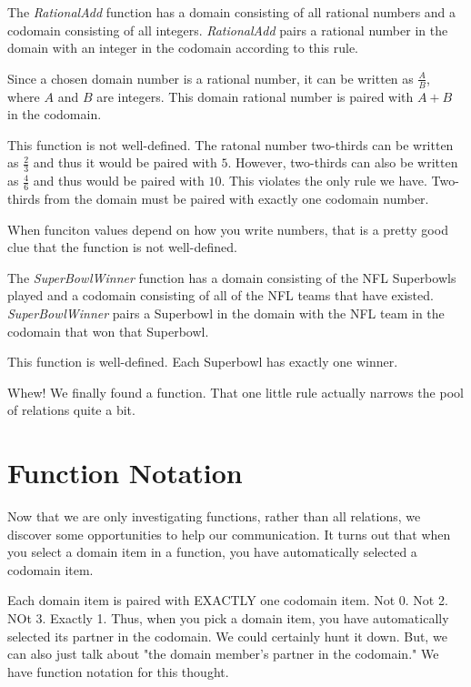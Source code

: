 \documentclass{ximera}
\begin{document}
\begin{example}
The \textit{RationalAdd} function has a domain consisting of all rational numbers and a codomain consisting of all integers.  \textit{RationalAdd} pairs a rational number in the domain with an integer in the codomain according to this rule.

Since a chosen domain number is a rational number, it can be written as $\tfrac{A}{B}$, where $A$ and $B$ are integers. This domain rational number is paired with $A+B$ in the codomain.

This function is not well-defined.  The ratonal number two-thirds can be written as $\tfrac{2}{3}$ and thus it would be paired with $5$.  However, two-thirds can also be written as $\tfrac{4}{6}$ and thus would be paired with $10$.  This violates the only rule we have.  Two-thirds from the domain must be paired with exactly one codomain number.

When funciton values depend on how you write numbers, that is a pretty good clue that the function is not well-defined.
\end{example}



\begin{example}
The \textit{SuperBowlWinner} function has a domain consisting of the NFL Superbowls played and a codomain consisting of all of the NFL teams that have existed.  \textit{SuperBowlWinner} pairs a Superbowl in the domain with the NFL team in the codomain that won that Superbowl. 

This function is well-defined. Each Superbowl has exactly one winner.
\end{example}

Whew!  We finally found a function. That one little rule actually narrows the pool of relations quite a bit.



\section{Function Notation}

Now that we are only investigating functions, rather than all relations, we discover some opportunities to help our communication.  It turns out that when you select a domain item in a function, you have automatically selected a codomain item.

Each domain item is paired with EXACTLY one codomain item.  Not 0. Not 2.  NOt 3.  Exactly 1.  Thus, when you pick a domain item, you have automatically selected its partner in the codomain.  We could certainly hunt it down.  But, we can also just talk about "the domain member's partner in the codomain."  We have function notation for this thought.
\end{document}
